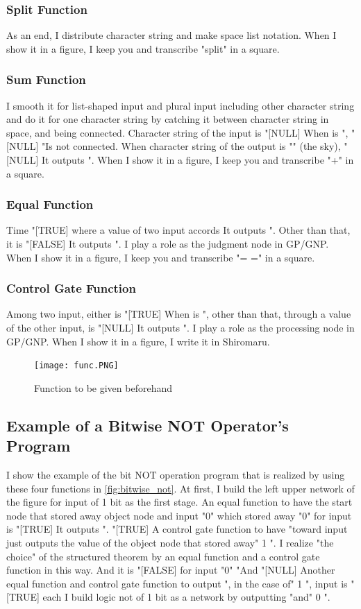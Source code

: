 \documentclass{article}
\begin{document}
\subsubsection{Split Function}
As an end, I distribute character string and make space list notation.
When I show it in a figure, I keep you and transcribe "split" in a square.

\subsubsection{Sum Function}
I smooth it for list-shaped input and plural input including other character string and do it for one character string by catching it between character string in space, and being connected.
Character string of the input is "[NULL]
When is ", "[NULL]
"Is not connected.
When character string of the output is "" (the sky), "[NULL]
It outputs ".
When I show it in a figure, I keep you and transcribe "+" in a square.

\subsubsection {Equal Function}
Time "[TRUE] where a value of two input accords
It outputs ".
Other than that, it is "[FALSE]
It outputs ".
I play a role as the judgment node in GP/GNP.
When I show it in a figure, I keep you and transcribe "= =" in a square.

\subsubsection {Control Gate Function}
Among two input, either is "[TRUE]
When is ", other than that, through a value of the other input, is "[NULL]
It outputs ".
I play a role as the processing node in GP/GNP.
When I show it in a figure, I write it in Shiromaru.

\begin{figure}[t]
\begin{center}
\texttt{[image: func.PNG]}
\end{center}
\caption {Function to be given beforehand}
\label{fig:func}
\end{figure}

\subsection {Example of a Bitwise NOT Operator's Program}
I show the example of the bit NOT operation program that is realized by using these four functions in \ref{fig:bitwise_not}.
At first, I build the left upper network of the figure for input of 1 bit as the first stage.
An equal function to have the start node that stored away object node and input "0" which stored away "0" for input is "[TRUE]
It outputs ".
"[TRUE]
A control gate function to have "toward input just outputs the value of the object node that stored away" 1 ".
I realize "the choice" of the structured theorem by an equal function and a control gate function in this way.
And it is "[FALSE] for input "0"
"And "[NULL]
Another equal function and control gate function to output ", in the case of" 1 ", input is "[TRUE] each
I build logic not of 1 bit as a network by outputting "and" 0 ".
\end{document}
